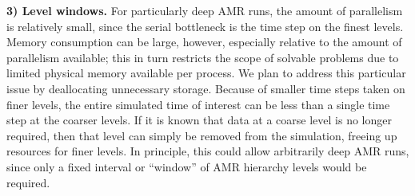 \documentclass[11pt,letterpaper]{article}
\newcounter{figctr}
\newcommand{\FIGURE}[3]{
\noindent
\parbox{\textwidth}{
\begin{center}
#3
\end{center}%
\ \nolinebreak%
\refstepcounter{figctr}%
\begin{center}%
\begin{minipage}{7.0in}
\textbf{Figure \thefigctr}. #1
\end{minipage}
\end{center}
\label{#2}
}}
\begin{document}






\textbf{3) Level windows.}  For particularly deep AMR runs, the amount
of parallelism is relatively small, since the serial bottleneck is the
time step on the finest levels.  Memory consumption can be large,
however, especially relative to the amount of parallelism available;
this in turn restricts the scope of solvable problems due to limited
physical memory available per process.  We plan to address this
particular issue by deallocating unnecessary storage.  Because of
smaller time steps taken on finer levels, the entire simulated time of
interest can be less than a single time step at the coarser levels.
If it is known that data at a coarse level is no longer required, then
that level can simply be removed from the simulation, freeing up
resources for finer levels.  In principle, this could allow
arbitrarily deep AMR runs, since only a fixed interval or ``window''
of AMR hierarchy levels would be required. 
\end{document}
